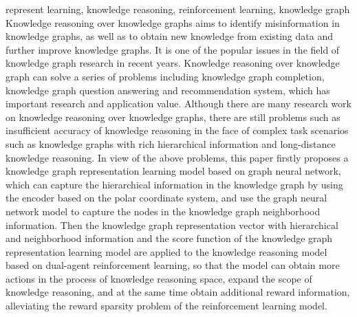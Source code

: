 \documentclass[algorithmlist, AutoFakeBold, AutoFakeSlant, figurelist, tablelist, nomlist, engineering]{seuthesix}
\begin{document}
\begin{englishabstract}{represent learning, knowledge reasoning, reinforcement learning, knowledge graph}
  Knowledge reasoning over knowledge graphs aims to identify misinformation in knowledge graphs, as well as to obtain new knowledge from existing data and further improve knowledge graphs. It is one of the popular issues in the field of knowledge graph research in recent years.
  Knowledge reasoning over knowledge graph can solve a series of problems including knowledge graph completion, knowledge graph question answering and recommendation system, which has important research and application value.
  Although there are many research work on knowledge reasoning over knowledge graphs, there are still problems such as insufficient accuracy of knowledge reasoning in the face of complex task scenarios such as knowledge graphs with rich hierarchical information and long-distance knowledge reasoning. 
  In view of the above problems, this paper firstly proposes a knowledge graph representation learning model based on graph neural network, which can capture the hierarchical information in the knowledge graph by using the encoder based on the polar coordinate system, and use the graph neural network model to capture the nodes in the knowledge graph neighborhood information.
  Then the knowledge graph representation vector with hierarchical and neighborhood information and the score function of the knowledge graph representation learning model are applied to the knowledge reasoning model based on dual-agent reinforcement learning, so that the model can obtain more actions in the process of knowledge reasoning space, expand the scope of knowledge reasoning, and at the same time obtain additional reward information, alleviating the reward sparsity problem of the reinforcement learning model.

\end{englishabstract}
\end{document}
